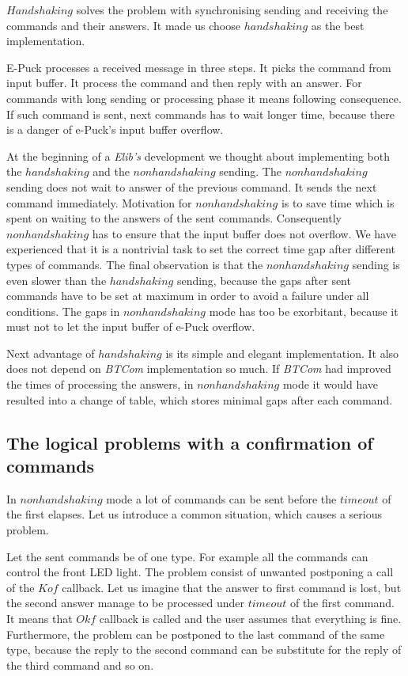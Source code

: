 	$Handshaking$ solves the problem with synchronising sending and receiving the commands and their answers. 
	It made us choose $handshaking$ as the best implementation.

	E-Puck processes a received message in three steps. It picks the command from input buffer.
	It process the command and then reply with an answer.
	For commands with long sending or processing phase it means following consequence.
	If such command is sent, next commands has to wait longer time, because there is a
	danger of e-Puck's input buffer overflow.

	At the beginning of a {\it Elib's} development we thought about implementing both the $handshaking$
	and the $nonhandshaking$ sending.
	The $nonhandshaking$ sending does not wait to answer of the previous command. It sends the next command immediately. 
	Motivation for $nonhandshaking$ is to save time which is spent on waiting to the answers of the sent commands.
	Consequently $nonhandshaking$ has to ensure that the input buffer does not overflow.
	We have experienced that it is a nontrivial task to set the correct time gap after different types of commands. 
	The final observation is that the $nonhandshaking$ sending is even slower than the $handshaking$ sending, 
	because the gaps after sent commands have to be set at maximum in order to avoid a failure under all conditions. 
	The gaps in $nonhandshaking$ mode has too be exorbitant, %
	because it must not to let the input buffer of e-Puck overflow.

	Next advantage of $handshaking$ is its simple and elegant implementation. It also does not depend on {\it BTCom} implementation so much.
	If {\it BTCom} had improved the times of processing the answers,
	in $nonhandshaking$ mode it would have resulted into a change of table, which stores minimal gaps after each command.



	\subsection{The logical problems with a confirmation of commands}\label{sec:logical}
	In $nonhandshaking$ mode a lot of commands can be sent before the $timeout$ of the first elapses.
	Let us introduce a common situation, which causes a serious problem. 
	
	Let the sent commands be of one type. For example all the commands can control the front LED light.	
	The problem consist of unwanted postponing a call of the $Kof$ callback. 
	Let us imagine that the answer to first command
	is lost, but the second answer manage to be processed under $timeout$ of the first command.
	It means that $Okf$ callback is called and the user assumes that everything is fine.
	Furthermore, the problem can be postponed to the last command of the same type,
	because the reply to the second command can be substitute for the reply of the third command
	and so on.

